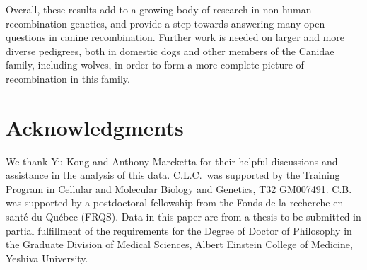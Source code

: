 Overall, these results add to a growing body of research in non-human recombination genetics, 
and provide a step towards answering many open questions in canine recombination.
Further work is needed on larger and more diverse pedigrees, both in domestic dogs and other members of the Canidae family, including wolves, in order to form a more complete picture of recombination in this family.




\section{Acknowledgments}
We thank Yu Kong and Anthony Marcketta for their helpful discussions and assistance in the analysis of this data.
C.L.C.\ was supported by the Training Program in Cellular and Molecular Biology and Genetics, T32 GM007491.
C.B. was supported by a postdoctoral fellowship from the Fonds de la recherche en sant\'{e} du Qu\'{e}bec (FRQS).
Data in this paper are from a thesis to be submitted in partial fulfillment of the requirements for the Degree of Doctor of Philosophy in the Graduate Division of Medical Sciences, Albert Einstein College of Medicine, Yeshiva University.



\clearpage
\renewcommand{\bibname}{References}

\begingroup
    \setlength{\bibsep}{10pt}
    \linespread{1}\selectfont
    
\endgroup

